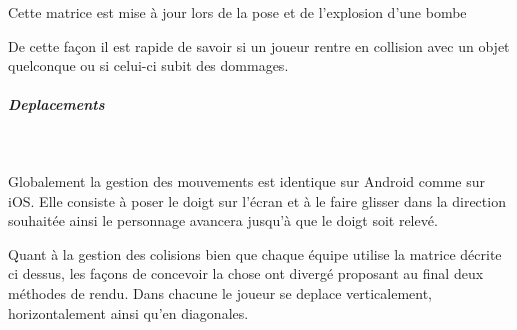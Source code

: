			Cette matrice est mise à jour lors de la pose et de l'explosion d'une bombe
			
			De cette façon il est rapide de savoir si un joueur rentre en collision avec
			un objet quelconque ou si celui-ci subit des dommages.
		

			\subparagraph{Deplacements\\}
			
				$\,$
			
				Globalement la gestion des mouvements est identique sur Android comme sur
				iOS.
				Elle consiste à poser le doigt sur l'écran et à le faire glisser dans la
				direction souhaitée ainsi le personnage avancera jusqu'à que le doigt soit
				relevé.				
				
				Quant à la gestion des colisions bien que chaque équipe utilise la matrice
				décrite ci dessus, les façons de concevoir la chose ont divergé proposant au
				final deux méthodes de rendu.
				Dans chacune le joueur se deplace verticalement, horizontalement ainsi qu'en
				diagonales.
				
